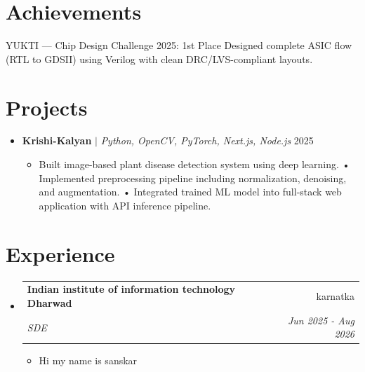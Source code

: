 \documentclass[a4paper,10pt]{article}
\makeatletter
\newcommand{\resumeSubheading}[4]{
  \vspace{-1pt}\item
    \begin{tabular*}{0.97\textwidth}[t]{l@{\extracolsep{\fill}}r}
      \textbf{#1} & #2 \\
      \textit{\small#3} & \textit{\small #4} \\
    \end{tabular*}\vspace{-5pt}
}
\makeatother
\begin{document}

\section{Achievements}
\begin{itemize}[leftmargin=0.15in,label=$\bullet$]
\small{

\item YUKTI — Chip Design Challenge 2025: 1st Place Designed complete ASIC flow (RTL to GDSII) using Verilog with clean DRC/LVS-compliant layouts.

}
\end{itemize}



\section{Projects}
\begin{itemize}[leftmargin=0.15in, label={}]

\item \textbf{Krishi-Kalyan} $|$ \emph{Python, OpenCV, PyTorch, Next.js, Node.js} \hfill 2025
\begin{itemize}

\item \small{Built image-based plant disease detection system using deep learning. • Implemented preprocessing pipeline including normalization, denoising, and augmentation. • Integrated trained ML model into full-stack web application with API inference pipeline.}

\end{itemize}

\end{itemize}



\section{Experience}
\begin{itemize}[leftmargin=0.15in, label={}]

\resumeSubheading
{Indian institute of information technology Dharwad}{karnatka}
{SDE}{Jun 2025 - Aug 2026}
\begin{itemize}

\item \small{Hi my name is sanskar}

\end{itemize}

\end{itemize}
\end{document}
